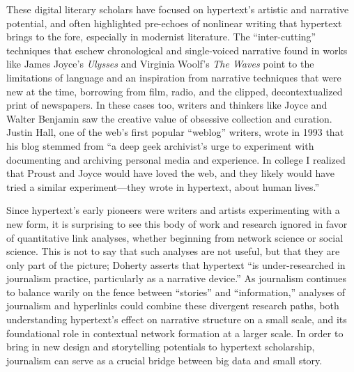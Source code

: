These digital literary scholars have focused on hypertext's artistic and narrative potential, and often highlighted pre-echoes of nonlinear writing that hypertext brings to the fore, especially in modernist literature. The ``inter-cutting'' techniques that eschew chronological and single-voiced narrative found in works like James Joyce's \emph{Ulysses} and Virginia Woolf's \emph{The Waves} point to the limitations of language and an inspiration from narrative techniques that were new at the time, borrowing from film, radio, and the clipped, decontextualized print of newspapers. In these cases too, writers and thinkers like Joyce and Walter Benjamin saw the creative value of obsessive collection and curation. Justin Hall, one of the web's first popular ``weblog'' writers, wrote in 1993 that his blog stemmed from ``a deep geek archivist's urge to experiment with documenting and archiving personal media and experience. In college I realized that Proust and Joyce would have loved the web, and they likely would have tried a similar experiment---they wrote in hypertext, about human lives.''\autocite{gillmor_we_2006}

Since hypertext's early pioneers were writers and artists experimenting with a new form, it is surprising to see this body of work and research ignored in favor of quantitative link analyses, whether beginning from network science or social science. This is not to say that such analyses are not useful, but that they are only part of the picture; Doherty asserts that hypertext ``is under-researched in journalism practice, particularly as a narrative device.''\autocite[124]{doherty_hypertext_2014} As journalism continues to balance warily on the fence between ``stories'' and ``information,'' analyses of journalism and hyperlinks could combine these divergent research paths, both understanding hypertext's effect on narrative structure on a small scale, and its foundational role in contextual network formation at a larger scale. In order to bring in new design and storytelling potentials to hypertext scholarship, journalism can serve as a crucial bridge between big data and small story.

